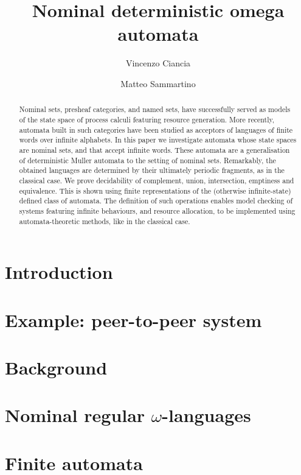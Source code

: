 \documentclass[orivec]{llncs}
\title{Nominal deterministic omega automata}
\author{Vincenzo Ciancia\inst{1} \and Matteo Sammartino\inst{2}}
\institute{ISTI-CNR, Pisa \and Dipartimento di Informatica, Universit\`a di Pisa, Pisa }
\begin{document}
\maketitle

\begin{abstract}
  Nominal sets, presheaf categories, and named sets, have successfully served as models of the state space of process calculi featuring resource generation. More recently, automata built in such categories have been studied as acceptors of languages of finite words over infinite alphabets. In this paper we investigate automata whose state spaces are nominal sets, and that accept infinite words. These automata are a generalisation of deterministic Muller automata to the setting of nominal sets. Remarkably, the obtained languages are determined by their ultimately periodic fragments, as in the classical case. We prove decidability of complement, union, intersection, emptiness and equivalence. This is shown using finite representations of the (otherwise infinite-state) defined class of automata. The definition of such operations enables model checking of systems featuring infinite behaviours, and resource allocation, to be implemented using automata-theoretic methods, like in the classical case.
\end{abstract}

\section{Introduction}\label{sec:introduction}

\section{Example: peer-to-peer system}\label{sec:example}


\section{Background}\label{sec:background}

\section{Nominal regular $\omega$-languages}\label{sec:languages}


\section{Finite automata}\label{sec:hd-automata}

\end{document}
